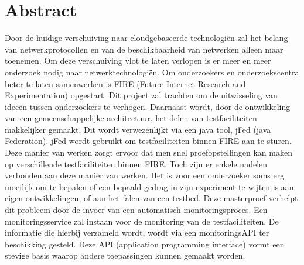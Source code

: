 \newpage
\chapter*{Abstract}
\npar
Door de huidige verschuiving naar cloudgebaseerde technologi\"en zal het belang 
van netwerkprotocollen en van de beschikbaarheid van netwerken alleen maar toenemen.
Om deze verschuiving vlot te laten verlopen is er meer en meer onderzoek nodig naar netwerktechnologi\"en.
Om onderzoekers en onderzoekscentra beter te laten samenwerken is FIRE (Future Internet Research and Experimentation) opgestart. Dit project zal trachten om de uitwisseling van ideeën tussen onderzoekers te verhogen. Daarnaast wordt, door de ontwikkeling van een gemeenschappelijke architectuur,  het delen van testfaciliteiten makkelijker gemaakt. Dit wordt verwezenlijkt via een java tool, jFed (java Federation). jFed wordt gebruikt om testfaciliteiten binnen FIRE aan te sturen. Deze manier van werken zorgt ervoor dat men snel proefopstellingen kan maken op verschillende testfaciliteiten binnen FIRE. Toch zijn er enkele nadelen verbonden aan deze manier van werken. Het is voor een onderzoeker soms erg moeilijk om te bepalen of een bepaald gedrag in zijn experiment te wijten is aan eigen ontwikkelingen, of aan het falen van een testbed.
\npar
Deze masterproef verhelpt dit probleem door de invoer van een automatisch monitoringsproces. Een monitoringsservice zal instaan voor de monitoring van de testfaciliteiten. De informatie die hierbij verzameld wordt, wordt via een monitoringsAPI ter beschikking gesteld. Deze API (application programming interface) vormt een stevige basis waarop andere toepassingen kunnen gemaakt worden.
